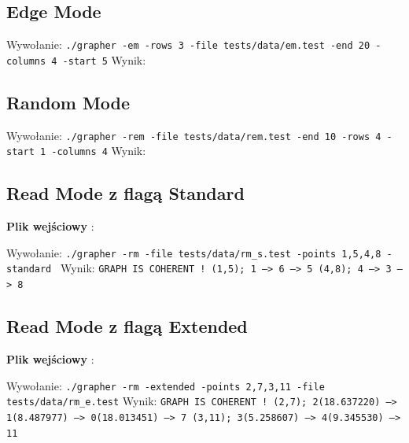 \documentclass[10pt, a4paper]{report}
\begin{document}
    \subsection{Edge Mode}
    Wywołanie:
    \newline\newline \texttt{./grapher -em -rows 3 -file tests/data/em.test -end 20 -columns 4 -start 5}
    \newline\newline Wynik:    
    

    \subsection{Random Mode}
    Wywołanie:
    \newline\newline \texttt{./grapher -rem -file tests/data/rem.test -end 10 -rows 4 -start 1 -columns 4}
    \newline\newline Wynik:
    
    \newpage

    \subsection{Read Mode z flagą Standard}
    \textbf{Plik wejściowy} :
    
    Wywołanie:
    \newline\newline \texttt{./grapher -rm -file tests/data/rm\_s.test -points 1,5,4,8 -standard }
    \newline\newline Wynik:
    \newline\newline \texttt{GRAPH IS COHERENT !\newline
    (1,5); 1 ---> 6 ---> 5
    \newline(4,8); 4 ---> 3 ---> 8}
    \newpage

    \subsection{Read Mode z flagą Extended}
    \textbf{Plik wejściowy} :
    
    Wywołanie:
    \newline\newline \texttt{./grapher -rm -extended -points 2,7,3,11 -file tests/data/rm\_e.test}
    \newline\newline Wynik:
    \texttt{\newline GRAPH IS COHERENT !\newline
    (2,7); 2(18.637220) ---> 1(8.487977) ---> 0(18.013451) ---> 7
    \newline(3,11); 3(5.258607) ---> 4(9.345530) ---> 11}
\end{document}
